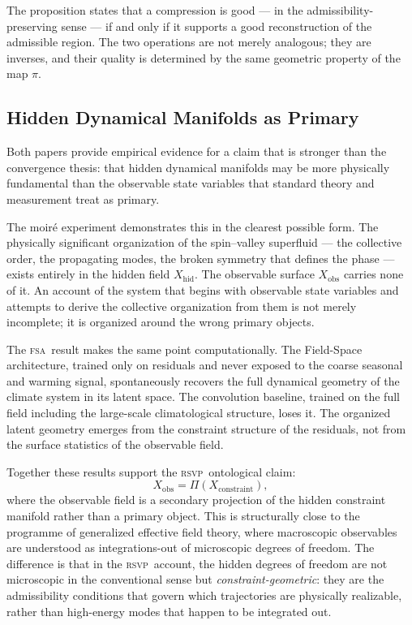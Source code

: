\documentclass[11pt,a4paper]{article}
\theoremstyle{plain}
\theoremstyle{definition}
\theoremstyle{remark}
\newcommand{\RSVP}{\textup{\textsc{rsvp}}}
\newcommand{\FSA}{\textup{\textsc{fsa}}}
\begin{document}
The proposition states that a compression is good --- in the
admissibility-preserving sense --- if and only if it supports a good
reconstruction of the admissible region. The two operations are not merely
analogous; they are inverses, and their quality is determined by the same
geometric property of the map $\pi$.

\subsection{Hidden Dynamical Manifolds as Primary}

Both papers provide empirical evidence for a claim that is stronger than
the convergence thesis: that hidden dynamical manifolds may be more
physically fundamental than the observable state variables that standard
theory and measurement treat as primary.

The moiré experiment demonstrates this in the clearest possible form.
The physically significant organization of the spin--valley superfluid ---
the collective order, the propagating modes, the broken symmetry that
defines the phase --- exists entirely in the hidden field $X_{\mathrm{hid}}$.
The observable surface $X_{\mathrm{obs}}$ carries none of it. An account of
the system that begins with observable state variables and attempts to derive
the collective organization from them is not merely incomplete; it is
organized around the wrong primary objects.

The \FSA\ result makes the same point computationally. The Field-Space
architecture, trained only on residuals and never exposed to the coarse
seasonal and warming signal, spontaneously recovers the full dynamical
geometry of the climate system in its latent space. The convolution baseline,
trained on the full field including the large-scale climatological structure,
loses it. The organized latent geometry emerges from the constraint structure
of the residuals, not from the surface statistics of the observable field.

Together these results support the \RSVP\ ontological claim:
\[
X_{\mathrm{obs}} = \Pi(X_{\mathrm{constraint}}),
\]
where the observable field is a secondary projection of the hidden constraint
manifold rather than a primary object. This is structurally close to the
programme of generalized effective field theory, where macroscopic
observables are understood as integrations-out of microscopic degrees of
freedom. The difference is that in the \RSVP\ account, the hidden degrees
of freedom are not microscopic in the conventional sense but
\textit{constraint-geometric}: they are the admissibility conditions that
govern which trajectories are physically realizable, rather than high-energy
modes that happen to be integrated out.
\end{document}
